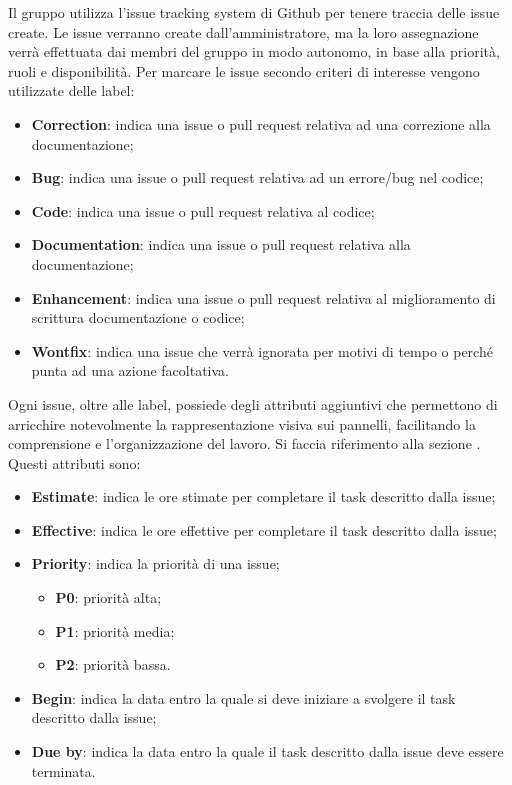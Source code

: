 \label{inf:its}
Il gruppo utilizza l'issue tracking system di Github per tenere traccia delle
issue create. Le issue verranno create dall'amministratore, ma la loro
assegnazione verrà effettuata dai membri del gruppo in modo autonomo, in base
alla priorità, ruoli e disponibilità. Per marcare le issue secondo criteri di
interesse vengono utilizzate delle label:
\begin{itemize}
    \item \textbf{Correction}: indica una issue o pull request relativa ad una correzione alla documentazione;
    \item \textbf{Bug}: indica una issue o pull request relativa ad un errore/bug nel codice;
    \item \textbf{Code}: indica una issue o pull request relativa al codice;
    \item \textbf{Documentation}: indica una issue o pull request relativa alla documentazione;
    \item \textbf{Enhancement}: indica una issue o pull request relativa al miglioramento di scrittura documentazione o codice;
    \item \textbf{Wontfix}: indica una issue che verrà ignorata per motivi di tempo o perché punta ad una azione facoltativa.
\end{itemize}
Ogni issue, oltre alle label, possiede degli attributi aggiuntivi che permettono di arricchire
notevolmente la rappresentazione visiva sui pannelli, facilitando la comprensione e l'organizzazione del lavoro.
Si faccia riferimento alla sezione .
Questi attributi sono:
\begin{itemize}
    \item \textbf{Estimate}: indica le ore stimate per completare il task descritto dalla issue;
    \item \textbf{Effective}: indica le ore effettive per completare il task descritto dalla issue;
    \item \textbf{Priority}: indica la priorità di una issue;
          \begin{itemize}
              \item \textbf{P0}: priorità alta;
              \item \textbf{P1}: priorità media;
              \item \textbf{P2}: priorità bassa.
          \end{itemize}
    \item \textbf{Begin}: indica la data entro la quale si deve iniziare a svolgere il task descritto dalla issue;
    \item \textbf{Due by}: indica la data entro la quale il task descritto dalla issue deve essere terminata.
\end{itemize}

